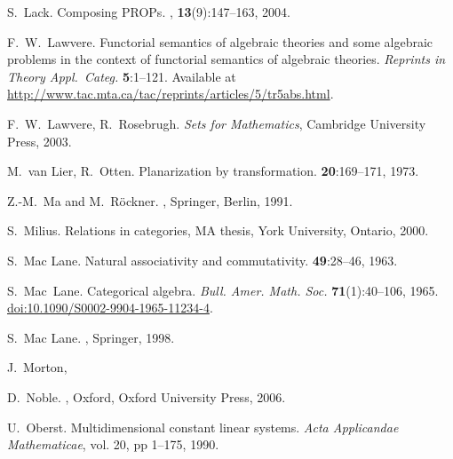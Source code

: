 \begin{thebibliography}{RSW00}
    S.\ Lack.
    \newblock Composing PROPs.
    , {\bf 13}(9):147--163,
    2004.

    F.\ W.\ Lawvere.
    \newblock Functorial semantics of algebraic theories and
    some algebraic problems in the context of functorial semantics of algebraic
    theories.
    \newblock \textsl{Reprints in Theory Appl.\ Categ.} {\bf 5}:1--121.
    \newblock 
    Available at
    \href{http://www.tac.mta.ca/tac/reprints/articles/5/tr5abs.html}
    {http://www.tac.mta.ca/tac/reprints/articles/5/tr5abs.html}.

    F.\ W.\ Lawvere, R.\ Rosebrugh.
    \newblock \emph{Sets for Mathematics},
    Cambridge University Press, 2003.

    M.\ van Lier, R.\ Otten.
    \newblock Planarization by transformation.
     {\bf 20}:169--171, 1973.

    Z.-M.\ Ma and M.\ R\"ockner.
    , Springer, Berlin, 1991.

    S.\ Milius.
    \newblock Relations in categories, MA thesis, York University,
    Ontario, 2000.

    S.\ Mac Lane.
    \newblock Natural associativity and commutativity.
     {\bf 49}:28--46, 1963. 

    S.\ Mac\ Lane.
    \newblock Categorical algebra.
    \newblock \emph{Bull. Amer. Math. Soc.} {\bf 71}(1):40--106, 1965.
    \newblock 
    \href{http://doi.org/10.1090/S0002-9904-1965-11234-4}{doi:10.1090/S0002-9904-1965-11234-4}.

    S.\ Mac Lane.
    ,
    Springer, 1998.

     J.\ Morton, 
    
    D.\ Noble.
    , Oxford, Oxford
    University Press, 2006.

    U.\ Oberst.
    \newblock Multidimensional constant linear systems.
    \newblock \emph{Acta Applicandae Mathematicae}, vol. 20, pp 1--175, 1990.


\end{thebibliography}
